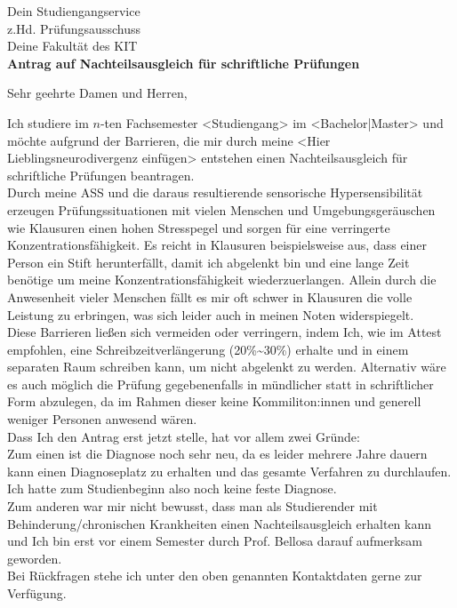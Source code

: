 \documentclass[a4paper, 11pt]{letter}
\begin{document}
\begin{letter}{
		Dein Studiengangservice\\
		z.Hd. Prüfungsausschuss \\
		Deine Fakultät des KIT\\
		\vspace{10mm}
		\textbf{Antrag auf Nachteilsausgleich für schriftliche Prüfungen}
	}
	\opening{Sehr geehrte Damen und Herren,}

	Ich studiere im $n$-ten Fachsemester <Studiengang> im <Bachelor|Master> und möchte aufgrund der Barrieren, die mir durch meine <Hier Lieblingsneurodivergenz einfügen> entstehen einen Nachteilsausgleich für schriftliche Prüfungen beantragen.\\
	Durch meine ASS und die daraus resultierende sensorische Hypersensibilität erzeugen Prüfungssituationen mit vielen Menschen und Umgebungsgeräuschen wie Klausuren einen hohen Stresspegel und sorgen für eine verringerte Konzentrationsfähigkeit. Es reicht in Klausuren beispielsweise aus, dass einer Person ein Stift herunterfällt, damit ich abgelenkt bin und eine lange Zeit benötige um meine Konzentrationsfähigkeit wiederzuerlangen. Allein durch die Anwesenheit vieler Menschen fällt es mir oft schwer in Klausuren die volle Leistung zu erbringen, was sich leider auch in meinen Noten widerspiegelt.\\
	Diese Barrieren ließen sich vermeiden oder verringern, indem Ich, wie im Attest empfohlen, eine Schreibzeitverlängerung (20\%\textasciitilde 30\%) erhalte und in einem separaten Raum schreiben kann, um nicht abgelenkt zu werden. Alternativ wäre es auch möglich die Prüfung gegebenenfalls in mündlicher statt in schriftlicher Form abzulegen, da im Rahmen dieser keine Kommiliton:innen und generell weniger Personen anwesend wären.\\
	Dass Ich den Antrag erst jetzt stelle, hat vor allem zwei Gründe:\\
	Zum einen ist die Diagnose noch sehr neu, da es leider mehrere Jahre dauern kann einen Diagnoseplatz zu erhalten und das gesamte Verfahren zu durchlaufen. Ich hatte zum Studienbeginn also noch keine feste Diagnose.\\
	Zum anderen war mir nicht bewusst, dass man als Studierender mit Behinderung/chronischen Krankheiten einen Nachteilsausgleich erhalten kann und Ich bin erst vor einem Semester durch Prof. Bellosa darauf aufmerksam geworden.\\
	Bei Rückfragen stehe ich unter den oben genannten Kontaktdaten gerne zur Verfügung.



\end{letter}
\end{document}
